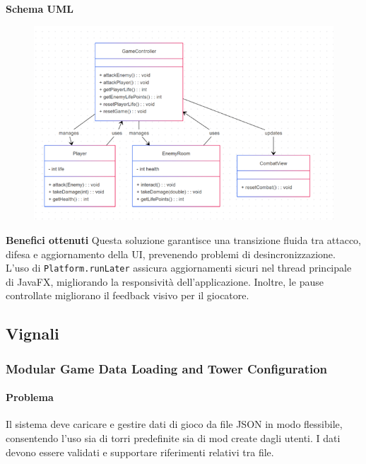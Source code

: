 \documentclass[a4paper,12pt]{report}
\begin{document}
\textbf{Schema UML}\newline
\begin{figure}[H]
	\includegraphics[scale=0.9]{img/montanariPlatform.png}
\end{figure}

\textbf{Benefici ottenuti}\newline
Questa soluzione garantisce una transizione fluida tra attacco, difesa e aggiornamento della UI, prevenendo problemi di desincronizzazione. L’uso di \texttt{Platform.runLater} assicura aggiornamenti sicuri nel thread principale di JavaFX, migliorando la responsività dell'applicazione. Inoltre, le pause controllate migliorano il feedback visivo per il giocatore.

\subsection{Vignali}

\subsubsection{Modular Game Data Loading and Tower Configuration}

\paragraph{Problema} Il sistema deve caricare e gestire dati di gioco da file JSON in modo flessibile, consentendo l'uso sia di torri predefinite sia di mod create dagli utenti. I dati devono essere validati e supportare riferimenti relativi tra file.
\end{document}

